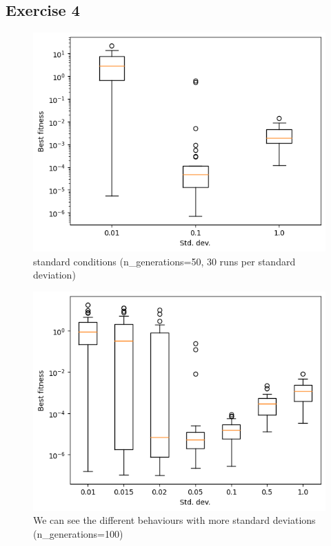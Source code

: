 \subsection{Exercise 4}
\begin{figure}[H]
    \centering
    \includegraphics[width=\linewidth]{images/lab1/compare_fitness.png}
    \caption{standard conditions (n\_generations=50, 30 runs per standard deviation) }
\end{figure}

\begin{figure}[H]
    \centering
    \includegraphics[width=\linewidth]{images/lab1/compare_fitness_1.png}
    \caption{We can see the different behaviours with more standard deviations (n\_generations=100)}
\end{figure}